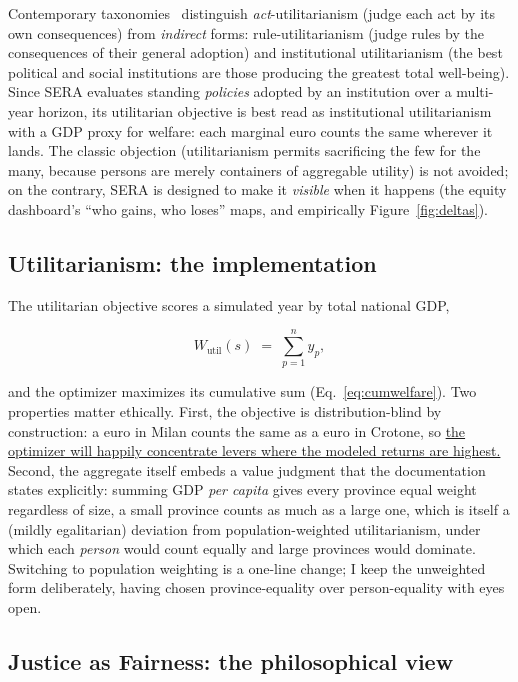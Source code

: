 \documentclass[11pt,a4paper]{article}
\begin{document}
Contemporary taxonomies~\cite{mulgan2007} distinguish \emph{act}-utilitarianism
(judge each act by its own consequences) from \emph{indirect} forms:
rule-utilitarianism (judge rules by the consequences of their general
adoption) and institutional utilitarianism (the best political and social
institutions are those producing the greatest total well-being). Since SERA
evaluates standing \emph{policies} adopted by an institution over a multi-year
horizon, its utilitarian objective is best read as institutional
utilitarianism with a GDP proxy for welfare: each marginal euro counts the same
wherever it lands. The classic objection (utilitarianism permits sacrificing
the few for the many, because persons are merely containers of aggregable
utility) is not avoided; on the contrary, SERA is designed to make it
\emph{visible} when it happens (the equity dashboard's ``who gains, who loses''
maps, and empirically Figure~\ref{fig:deltas}).

\subsection{Utilitarianism: the implementation}

The utilitarian objective scores a simulated year by total national GDP,

\begin{equation}
    W_{\text{util}}(s) \;=\; \sum_{p=1}^{n} y_p ,
\end{equation}

and the optimizer maximizes its cumulative sum (Eq.~\ref{eq:cumwelfare}). Two
properties matter ethically. First, the objective is distribution-blind by
construction: a euro in Milan counts the same as a euro in Crotone, so \uline{the
optimizer will happily concentrate levers where the modeled returns are
highest.} Second, the aggregate itself embeds a value judgment that the
documentation states explicitly: summing GDP \emph{per capita} gives every
province equal weight regardless of size, a small province counts as much as
a large one, which is itself a (mildly egalitarian) deviation from
population-weighted utilitarianism, under which each \emph{person} would count
equally and large provinces would dominate. Switching to population weighting is
a one-line change; I keep the unweighted form deliberately, having chosen
province-equality over person-equality with eyes open.

\subsection{Justice as Fairness: the philosophical view}
\end{document}
